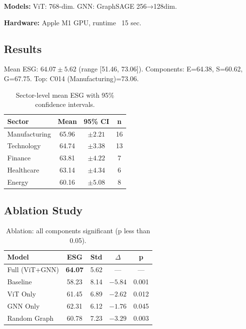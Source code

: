 \documentclass[10pt,twocolumn]{article}
\begin{document}
\textbf{Models:} ViT: 768-dim. GNN: GraphSAGE 256→128dim.

\textbf{Hardware:} Apple M1 GPU, runtime ~15 sec.

\subsection{Results}

Mean ESG: $64.07 \pm 5.62$ (range [51.46, 73.06]). Components: E=64.38, S=60.62, G=67.75. Top: C014 (Manufacturing)=73.06.

\begin{table}[h]
\centering
\small
\begin{tabular}{lccc}
\toprule
\textbf{Sector} & \textbf{Mean} & \textbf{95\% CI} & \textbf{n} \\
\midrule
Manufacturing & 65.96 & $\pm 2.21$ & 16 \\
Technology & 64.74 & $\pm 3.38$ & 13 \\
Finance & 63.81 & $\pm 4.22$ & 7 \\
Healthcare & 63.14 & $\pm 4.34$ & 6 \\
Energy & 60.16 & $\pm 5.08$ & 8 \\
\bottomrule
\end{tabular}
\caption{Sector-level mean ESG with 95\% confidence intervals.}
\end{table}

\subsection{Ablation Study}

\begin{table}[h]
\centering
\small
\begin{tabular}{lcccc}
\toprule
\textbf{Model} & \textbf{ESG} & \textbf{Std} & \textbf{$\Delta$} & \textbf{p} \\
\midrule
Full (ViT+GNN) & \textbf{64.07} & 5.62 & --- & --- \\
Baseline & 58.23 & 8.14 & $-5.84$ & 0.001 \\
ViT Only & 61.45 & 6.89 & $-2.62$ & 0.012 \\
GNN Only & 62.31 & 6.12 & $-1.76$ & 0.045 \\
Random Graph & 60.78 & 7.23 & $-3.29$ & 0.003 \\
\bottomrule
\end{tabular}
\caption{Ablation: all components significant (p less than 0.05).}
\end{table}
\end{document}
